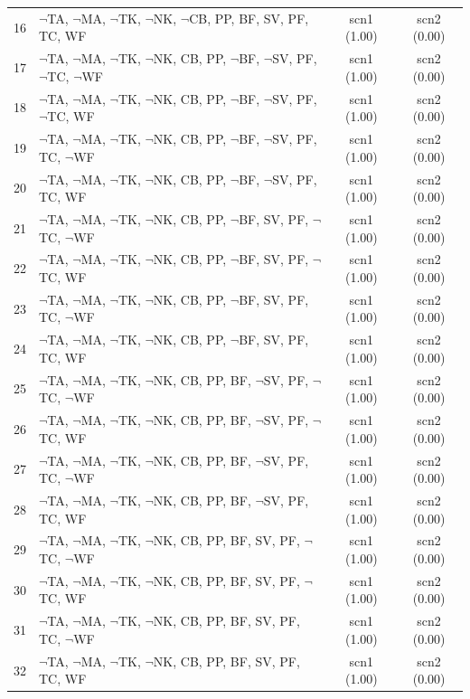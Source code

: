\documentclass[12pt]{article}
\begin{document}
\begin{longtable}{|l|l|c|c|}
16 & $\neg$TA, $\neg$MA, $\neg$TK, $\neg$NK, $\neg$CB, PP, BF, SV, PF, TC, WF & scn1 (1.00) & scn2 (0.00)\\
17 & $\neg$TA, $\neg$MA, $\neg$TK, $\neg$NK, CB, PP, $\neg$BF, $\neg$SV, PF, $\neg$TC, $\neg$WF & scn1 (1.00) & scn2 (0.00)\\
18 & $\neg$TA, $\neg$MA, $\neg$TK, $\neg$NK, CB, PP, $\neg$BF, $\neg$SV, PF, $\neg$TC, WF & scn1 (1.00) & scn2 (0.00)\\
19 & $\neg$TA, $\neg$MA, $\neg$TK, $\neg$NK, CB, PP, $\neg$BF, $\neg$SV, PF, TC, $\neg$WF & scn1 (1.00) & scn2 (0.00)\\
20 & $\neg$TA, $\neg$MA, $\neg$TK, $\neg$NK, CB, PP, $\neg$BF, $\neg$SV, PF, TC, WF & scn1 (1.00) & scn2 (0.00)\\
21 & $\neg$TA, $\neg$MA, $\neg$TK, $\neg$NK, CB, PP, $\neg$BF, SV, PF, $\neg$TC, $\neg$WF & scn1 (1.00) & scn2 (0.00)\\
22 & $\neg$TA, $\neg$MA, $\neg$TK, $\neg$NK, CB, PP, $\neg$BF, SV, PF, $\neg$TC, WF & scn1 (1.00) & scn2 (0.00)\\
23 & $\neg$TA, $\neg$MA, $\neg$TK, $\neg$NK, CB, PP, $\neg$BF, SV, PF, TC, $\neg$WF & scn1 (1.00) & scn2 (0.00)\\
24 & $\neg$TA, $\neg$MA, $\neg$TK, $\neg$NK, CB, PP, $\neg$BF, SV, PF, TC, WF & scn1 (1.00) & scn2 (0.00)\\
25 & $\neg$TA, $\neg$MA, $\neg$TK, $\neg$NK, CB, PP, BF, $\neg$SV, PF, $\neg$TC, $\neg$WF & scn1 (1.00) & scn2 (0.00)\\
26 & $\neg$TA, $\neg$MA, $\neg$TK, $\neg$NK, CB, PP, BF, $\neg$SV, PF, $\neg$TC, WF & scn1 (1.00) & scn2 (0.00)\\
27 & $\neg$TA, $\neg$MA, $\neg$TK, $\neg$NK, CB, PP, BF, $\neg$SV, PF, TC, $\neg$WF & scn1 (1.00) & scn2 (0.00)\\
28 & $\neg$TA, $\neg$MA, $\neg$TK, $\neg$NK, CB, PP, BF, $\neg$SV, PF, TC, WF & scn1 (1.00) & scn2 (0.00)\\
29 & $\neg$TA, $\neg$MA, $\neg$TK, $\neg$NK, CB, PP, BF, SV, PF, $\neg$TC, $\neg$WF & scn1 (1.00) & scn2 (0.00)\\
30 & $\neg$TA, $\neg$MA, $\neg$TK, $\neg$NK, CB, PP, BF, SV, PF, $\neg$TC, WF & scn1 (1.00) & scn2 (0.00)\\
31 & $\neg$TA, $\neg$MA, $\neg$TK, $\neg$NK, CB, PP, BF, SV, PF, TC, $\neg$WF & scn1 (1.00) & scn2 (0.00)\\
32 & $\neg$TA, $\neg$MA, $\neg$TK, $\neg$NK, CB, PP, BF, SV, PF, TC, WF & scn1 (1.00) & scn2 (0.00)\\

\end{longtable}
\end{document}

